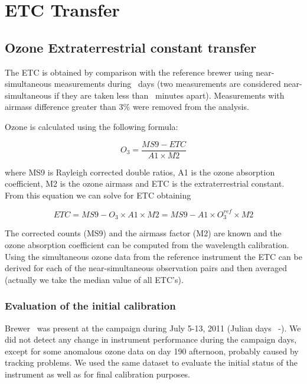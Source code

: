 

\section{ETC Transfer} \label{sec:ETC}

\subsection{Ozone Extraterrestrial constant transfer}
The ETC is obtained by comparison with the reference brewer \textbf{\brwref} using near-simultaneous measurements during \textbf{\caldays}\ days (two measurements are considered near-simultaneous if they are taken less than \textbf{\Tsync}\ minutes apart). Measurements with airmass difference greater than 3\% were removed from the analysis.

Ozone is calculated using the following formula:

\begin{equation}
    O_3 = \frac{MS9 - ETC}{A1 \times M2}  
    \label{eq:etc}
\end{equation}

\noindent where MS9 is Rayleigh corrected double ratios, A1 is the ozone absorption coefficient, M2 is the ozone airmass and ETC is the extraterrestrial constant. From this equation we can solve for ETC obtaining

\[ETC = MS9 - O_3 \times A1 \times M2 = MS9 - A1 \times O_{3}^{ref} \times M2\]
  
The corrected counts (MS9) and the airmass factor (M2) are known and the ozone absorption coefficient can be computed from the wavelength calibration. Using the simultaneous ozone data from the reference instrument the ETC can be derived for each of the near-simultaneous observation pairs and then averaged (actually we take the median value of all ETC's).

\subsubsection{Evaluation of the initial calibration}
Brewer \brwname\ was present at the campaign during July 5-13, 2011 (Julian days \CALINI\ -\CALEND). We did not detect any change in instrument performance during the campaign days, except for some anomalous ozone data on day 190 afternoon, probably caused by tracking problems. We used the same dataset to evaluate the initial status of the instrument as well as for final calibration purposes.


